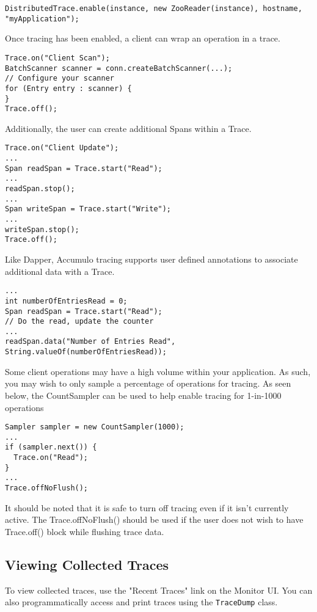 \begingroup\fontsize{8pt}{8pt}\selectfont\begin{verbatim}
DistributedTrace.enable(instance, new ZooReader(instance), hostname, "myApplication");
\end{verbatim}\endgroup

Once tracing has been enabled, a client can wrap an operation in a trace.

\begingroup\fontsize{8pt}{8pt}\selectfont\begin{verbatim}
Trace.on("Client Scan");
BatchScanner scanner = conn.createBatchScanner(...);
// Configure your scanner
for (Entry entry : scanner) {
}
Trace.off();
\end{verbatim}\endgroup

Additionally, the user can create additional Spans within a Trace.
\begingroup\fontsize{8pt}{8pt}\selectfont\begin{verbatim}
Trace.on("Client Update");
...
Span readSpan = Trace.start("Read");
...
readSpan.stop();
...
Span writeSpan = Trace.start("Write");
...
writeSpan.stop();
Trace.off();
\end{verbatim}\endgroup

Like Dapper, Accumulo tracing supports user defined annotations to associate additional data with a Trace.
\begingroup\fontsize{8pt}{8pt}\selectfont\begin{verbatim}
...
int numberOfEntriesRead = 0;
Span readSpan = Trace.start("Read");
// Do the read, update the counter
...
readSpan.data("Number of Entries Read", String.valueOf(numberOfEntriesRead));
\end{verbatim}\endgroup

Some client operations may have a high volume within your
application. As such, you may wish to only sample a percentage of
operations for tracing. As seen below, the CountSampler can be used to
help enable tracing for 1-in-1000 operations
\begingroup\fontsize{8pt}{8pt}\selectfont\begin{verbatim}
Sampler sampler = new CountSampler(1000);
...
if (sampler.next()) {
  Trace.on("Read");
}
...
Trace.offNoFlush();
\end{verbatim}\endgroup

It should be noted that it is safe to turn off tracing even if it
isn't currently active. The Trace.offNoFlush() should be used if the
user does not wish to have Trace.off() block while flushing trace
data.

\subsection{Viewing Collected Traces}
To view collected traces, use the "Recent Traces" link on the Monitor
UI. You can also programmatically access and print traces using the
\texttt{TraceDump} class.

